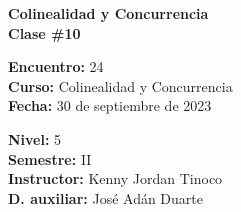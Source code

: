 \begin{center} \textbf
{
    \Large Colinealidad y Concurrencia \\ \vspace{2mm}Clase \#10
}
\end{center}

\begin{multicols}{2}
{
    \textbf{Encuentro:} 24\\
    \textbf{Curso:} Colinealidad y Concurrencia\\
    \textbf{Fecha:} 30 de septiembre de 2023\\
    \begin{flushright}
        \textbf{Nivel:} 5\\
        \textbf{Semestre:} II\\
        \textbf{Instructor:} Kenny Jordan Tinoco\\
        \textbf{D. auxiliar:} José Adán Duarte
    \end{flushright}
}
\end{multicols}

\thispagestyle{first-page-style}